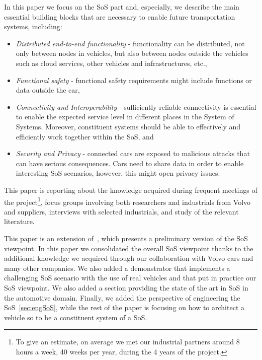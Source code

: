 In this paper we focus on the SoS part and, especially, we describe the main essential building blocks that are necessary to enable future transportation systems, including: 

\begin{itemize}
\item {\em Distributed end-to-end functionality} - functionality can be distributed, not only between nodes in vehicles, but also between nodes outside the vehicles such as cloud services, other vehicles and infrastructures, etc., 
\item {\em Functional safety} - functional safety requirements might include functions or data outside the car, 
\item {\em Connectivity and Interoperability} - sufficiently reliable connectivity is essential to enable the expected service level in different places in the System of Systems. Moreover, constituent systems should be able to effectively and efficiently work together within the SoS, and 
\item {\em Security and Privacy} - connected cars are exposed to malicious attacks that can have serious consequences. Cars need to share data in order to enable interesting SoS scenarios, however, this might open privacy issues.
\end{itemize}

This paper is reporting about the knowledge acquired during frequent meetings of the project\footnote{To give an estimate, on average we met our industrial partners around 8 hours a week, 40 weeks per year, during the 4 years of the project.}, %
focus groups involving both researchers and industrials from Volvo and suppliers, interviews with selected industrials, and study of the relevant literature.

This paper is an extension of~\cite{Pelliccione2017_SoS}, which presents a preliminary version of the SoS viewpoint. In this paper we consolidated the overall SoS viewpoint thanks to the additional knowledge we acquired through our collaboration with Volvo cars and many other companies. %
We also added a demonstrator that implements a challenging SoS scenario with the use of real vehicles and that put in practice our SoS viewpoint. We also added a section providing the state of the art in SoS in the automotive domain. Finally, we added the perspective of engineering the SoS~\ref{sec:engSoS}, while the rest of the paper is focusing on how to architect a vehicle so to be a constituent system of a SoS.



